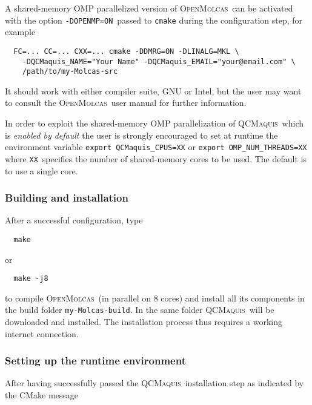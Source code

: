 \documentclass[bibliography=totoc,12pt,a4paper]{scrartcl}
\newcommand{\mol}{\textsc{OpenMolcas}}
\newcommand{\qcm}{\textsc{QCMaquis}}
\newcommand{\molbuild}{\texttt{my-Molcas-build}}
\begin{document}
\vspace{2ex}

A shared-memory OMP parallelized version of \mol\ can be activated with the option \texttt{-DOPENMP=ON}\ passed to \texttt{cmake} during the configuration step, for example

\begin{verbatim}
  FC=... CC=... CXX=... cmake -DDMRG=ON -DLINALG=MKL \
    -DQCMaquis_NAME="Your Name" -DQCMaquis_EMAIL="your@email.com" \
    /path/to/my-Molcas-src
\end{verbatim}

\noindent It should work with either compiler suite, GNU or Intel, but the user may want to consult the \mol\ user manual for further information.

\vspace{2ex}

In order to exploit the shared-memory OMP parallelization of \qcm\ which is \emph{enabled by default} the user is strongly encouraged to set at runtime the environment variable \texttt{export QCMaquis\_CPUS=XX} or \texttt{export OMP\_NUM\_THREADS=XX}
where \texttt{XX}\ specifies the number of shared-memory cores to be used.
The default is to use a single core.

\subsubsection{Building and installation}\label{subsubsec:build}

After a successful configuration, type
\begin{verbatim}
  make
\end{verbatim}

\noindent or

\begin{verbatim}
  make -j8
\end{verbatim}
%
to compile \mol\ (in parallel on 8 cores) and install all its components in the build folder \texttt{\molbuild}.
In the same folder \qcm\ will be downloaded and installed.
The installation process thus requires a working internet connection.

\subsubsection{Setting up the runtime environment}\label{subsubsec:runtime}

After having successfully passed the \qcm\ installation step as indicated by the CMake message
\end{document}
